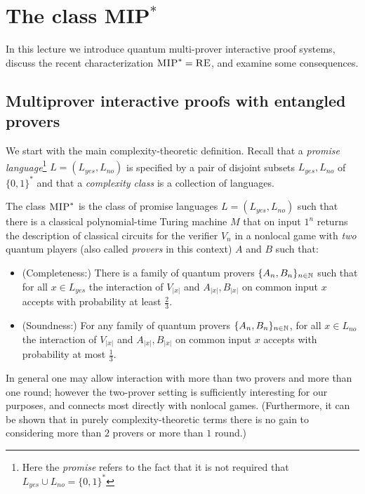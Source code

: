 
\chapter{The class MIP$^*$}

In this lecture we  introduce quantum multi-prover interactive proof systems, discuss the recent characterization $\textsc{MIP}^*=\textsc{RE}$, and examine some consequences. 

\section{Multiprover interactive proofs  with entangled provers}

We start with the main complexity-theoretic definition. Recall that a \emph{promise language}\footnote{Here the \emph{promise} refers to the fact that it is not required that $L_{yes}\cup L_{no} = \{0,1\}^*$}  $L=(L_{yes},L_{no})$ is specified by a pair of disjoint subsets $L_{yes},L_{no}$ of $\{0,1\}^*$ and that a \emph{complexity class} is a collection of languages. 

\begin{definition} \label{def:mipstar}
The class $\textsc{MIP}^*$ is the class of promise languages $L = (L_{yes}, L_{no})$ such that there is a classical polynomial-time Turing machine $M$ that on input $1^n$ returns the description of classical circuits for the verifier $V_n$ in a nonlocal game with \emph{two} quantum players (also called \emph{provers} in this context) $A$ and $B$ such that: 
\begin{itemize}
\item (Completeness:) There is a family of quantum provers $\{A_n,B_n\}_{n\in \mathbb{N}}$ 
such that for all $x\in L_{yes}$ the interaction of $V_{|x|}$ and $A_{|x|}, B_{|x|}$ on common input $x$ accepts with probability at least $\frac{2}{3}$.
\item (Soundness:) For any family of quantum provers $\{A_n,B_n\}_{n\in \mathbb{N}}$, for all $x\in L_{no}$ the interaction of $V_{|x|}$ and $A_{|x|},B_{|x|}$ on common input $x$ accepts with probability at most $\frac{1}{3}$.
\end{itemize}
\end{definition}

 In general one may allow interaction with more than two provers and more than one round; however the two-prover setting is sufficiently interesting for our purposes, and connects most directly with nonlocal games. (Furthermore, it can be shown that in purely complexity-theoretic terms there is no gain to considering more than $2$ provers or more than $1$ round.)



